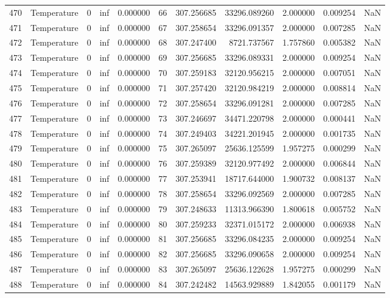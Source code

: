 \begin{tabular}{llrrrrrrrrr}
470 & Temperature & 0 & inf & 0.000000 & 66 & 307.256685 & 33296.089260 & 2.000000 & 0.009254 & NaN \\
471 & Temperature & 0 & inf & 0.000000 & 67 & 307.258654 & 33296.091357 & 2.000000 & 0.007285 & NaN \\
472 & Temperature & 0 & inf & 0.000000 & 68 & 307.247400 & 8721.737567 & 1.757860 & 0.005382 & NaN \\
473 & Temperature & 0 & inf & 0.000000 & 69 & 307.256685 & 33296.089331 & 2.000000 & 0.009254 & NaN \\
474 & Temperature & 0 & inf & 0.000000 & 70 & 307.259183 & 32120.956215 & 2.000000 & 0.007051 & NaN \\
475 & Temperature & 0 & inf & 0.000000 & 71 & 307.257420 & 32120.984219 & 2.000000 & 0.008814 & NaN \\
476 & Temperature & 0 & inf & 0.000000 & 72 & 307.258654 & 33296.091281 & 2.000000 & 0.007285 & NaN \\
477 & Temperature & 0 & inf & 0.000000 & 73 & 307.246697 & 34471.220798 & 2.000000 & 0.000441 & NaN \\
478 & Temperature & 0 & inf & 0.000000 & 74 & 307.249403 & 34221.201945 & 2.000000 & 0.001735 & NaN \\
479 & Temperature & 0 & inf & 0.000000 & 75 & 307.265097 & 25636.125599 & 1.957275 & 0.000299 & NaN \\
480 & Temperature & 0 & inf & 0.000000 & 76 & 307.259389 & 32120.977492 & 2.000000 & 0.006844 & NaN \\
481 & Temperature & 0 & inf & 0.000000 & 77 & 307.253941 & 18717.644000 & 1.900732 & 0.008137 & NaN \\
482 & Temperature & 0 & inf & 0.000000 & 78 & 307.258654 & 33296.092569 & 2.000000 & 0.007285 & NaN \\
483 & Temperature & 0 & inf & 0.000000 & 79 & 307.248633 & 11313.966390 & 1.800618 & 0.005752 & NaN \\
484 & Temperature & 0 & inf & 0.000000 & 80 & 307.259233 & 32371.015172 & 2.000000 & 0.006938 & NaN \\
485 & Temperature & 0 & inf & 0.000000 & 81 & 307.256685 & 33296.084235 & 2.000000 & 0.009254 & NaN \\
486 & Temperature & 0 & inf & 0.000000 & 82 & 307.256685 & 33296.090658 & 2.000000 & 0.009254 & NaN \\
487 & Temperature & 0 & inf & 0.000000 & 83 & 307.265097 & 25636.122628 & 1.957275 & 0.000299 & NaN \\
488 & Temperature & 0 & inf & 0.000000 & 84 & 307.242482 & 14563.929889 & 1.842055 & 0.001179 & NaN \\

\end{tabular}
